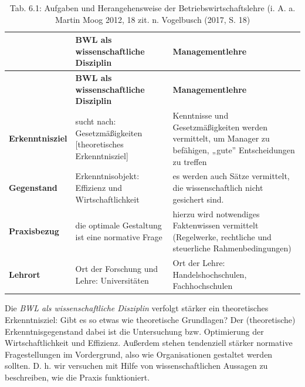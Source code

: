 \documentclass[
  letterpaper,
]{book}
\begin{document}
\begin{longtable}[]{@{}
  >{\raggedright\arraybackslash}p{}
  >{\raggedright\arraybackslash}p{}
  >{\raggedright\arraybackslash}p{}@{}}
\caption{Tab. 6.1: Aufgaben und Herangehensweise der
Betriebswirtschaftslehre (i. A. a. Martin Moog 2012, 18 zit. n.
Vogelbusch (2017, S. 18)}\tabularnewline
\toprule\noalign{}
\begin{minipage}[b]{\linewidth}\raggedright
\end{minipage} & \begin{minipage}[b]{\linewidth}\raggedright
\textbf{BWL als wissenschaftliche Disziplin}
\end{minipage} & \begin{minipage}[b]{\linewidth}\raggedright
\textbf{Managementlehre}
\end{minipage} \\
\midrule\noalign{}
\endfirsthead
\toprule\noalign{}
\begin{minipage}[b]{\linewidth}\raggedright
\end{minipage} & \begin{minipage}[b]{\linewidth}\raggedright
\textbf{BWL als wissenschaftliche Disziplin}
\end{minipage} & \begin{minipage}[b]{\linewidth}\raggedright
\textbf{Managementlehre}
\end{minipage} \\
\midrule\noalign{}
\endhead
\bottomrule\noalign{}
\endlastfoot
\textbf{Erkenntnisziel} & sucht nach: Gesetzmäßigkeiten {[}theoretisches
Erkenntnisziel{]} & Kenntnisse und Gesetzmäßigkeiten werden vermittelt,
um Manager zu befähigen, „gute'' Entscheidungen zu treffen \\
\textbf{Gegenstand} & Erkenntnisobjekt: Effizienz und Wirtschaftlichkeit
& es werden auch Sätze vermittelt, die wissenschaftlich nicht gesichert
sind. \\
\textbf{Praxisbezug} & die optimale Gestaltung ist eine normative Frage
& hierzu wird notwendiges Faktenwissen vermittelt (Regelwerke,
rechtliche und steuerliche Rahmenbedingungen) \\
\textbf{Lehrort} & Ort der Forschung und Lehre: Universitäten & Ort der
Lehre: Handelshochschulen, Fachhochschulen \\
\end{longtable}

Die \emph{BWL als wissenschaftliche Disziplin} verfolgt stärker ein
theoretisches Erkenntnisziel: Gibt es so etwas wie theoretische
Grundlagen? Der (theoretische) Erkenntnisgegenstand dabei ist die
Untersuchung bzw. Optimierung der Wirtschaftlichkeit und Effizienz.
Außerdem stehen tendenziell stärker normative Fragestellungen im
Vordergrund, also wie Organisationen gestaltet werden sollten. D. h. wir
versuchen mit Hilfe von wissenschaftlichen Aussagen zu beschreiben, wie
die Praxis funktioniert.
\end{document}
